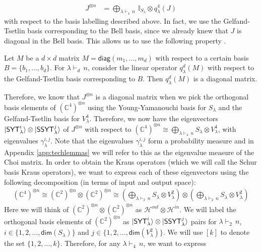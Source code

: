 \documentclass[11pt]{article}
\DeclarePairedDelimiter\ket{\lvert}{\rangle}
\begin{document}
\begin{align*}
    J^{\otimes n} &= \bigoplus_{\lambda\vdash_4\,n}~\mathbb{I}_{S_{\lambda}} \otimes q^4_{\lambda}(J)
\end{align*}
with respect to the basis labelling described above. In fact, we use the Gelfand-Tsetlin basis corresponding to the Bell basis, since we already knew that $J$ is diagonal in the Bell basis. This allows us to use the following property \cite{Mol06}.
\begin{lemma}
    Let $M$ be a $d \times d$ matrix $M = \mathsf{diag}(m_1, \ldots, m_d)$ with respect to a certain basis $B = \{b_1, \ldots, b_d\}$. For $\lambda \vdash_d\, n$, consider the linear operator $q^d_{\lambda}(M)$ with respect to the Gelfand-Tsetlin basis corresponding to $B$. Then $q^d_{\lambda}(M)$ is a diagonal matrix.
\end{lemma}
Therefore, we know that $J^{\otimes n}$ is a diagonal matrix when we pick the orthogonal basis elements of $(\mathbb{C}^4)^{\otimes n}$ using the Young-Yamanouchi basis for $S_{\lambda}$ and the Gelfand-Tsetlin basis for $V^4_{\lambda}$. Therefore, we now have the eigenvectors $\ket{\mathsf{SYT}^i_\lambda} \otimes \ket{\mathsf{SSYT}^j_\lambda}$ of $J^{\otimes n}$ with respect to $(\mathbb{C}^4)^{\otimes n} \cong \bigoplus_{\lambda \vdash_4\, n} S_{\lambda} \otimes V^4_{\lambda}$, with eigenvalues $\gamma_{\lambda}^{i,j}$. Note that the eigenvalues $\gamma_{\lambda}^{i,j}$ form a probability measure and in Appendix \ref{app:techlemmas} we will refer to this as the eigenvalue measure of the Choi matrix.  In order to obtain the Kraus operators (which we will call the Schur basis Kraus operators), we want to express each of these eigenvectors using the following decomposition (in terms of input and output space):
\begin{align*}
    (\mathbb{C}^4)^{\otimes n} \cong (\mathbb{C}^2)^{\otimes n} \otimes (\mathbb{C}^2)^{\otimes n} \cong \left(\bigoplus_{\lambda \vdash_2\, n} S_{\lambda} \otimes V^2_{\lambda}\right) \otimes \left(\bigoplus_{\lambda \vdash_2\, n} S_{\lambda} \otimes V^2_{\lambda}\right)
\end{align*}
Here we will think of $(\mathbb{C}^2)^{\otimes n} \otimes (\mathbb{C}^2)^{\otimes n}$ as $\mathcal{H}^{out} \otimes \mathcal{H}^{in}$. We will label the orthogonal basis elements of $(\mathbb{C}^2)^{\otimes n}$ as $\ket{\mathsf{SYT}^i_\lambda} \otimes \ket{\mathsf{SSYT}^j_\lambda}$ pairs for $\lambda \vdash_2\, n$, $i \in \{1, 2, \ldots, \mathsf{dim}(S_{\lambda})\}$ and $j \in \{1, 2, \ldots, \mathsf{dim}(V^2_{\lambda})\}$. We will use $[k]$ to denote the set $\{1, 2, \ldots, k\}$. Therefore, for any $\lambda \vdash_4\, n$, we want to express
\end{document}
